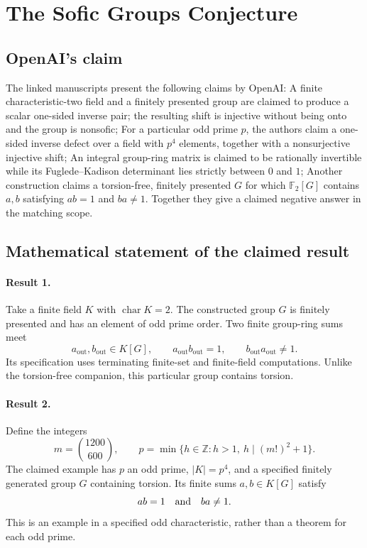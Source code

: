 \documentclass[11pt]{article}
\begin{document}
\section*{The Sofic Groups Conjecture}

\subsection{OpenAI's claim}
The linked manuscripts present the following claims by OpenAI: A finite characteristic-two field and a finitely presented group are claimed to produce a scalar one-sided inverse pair; the resulting shift is injective without being onto and the group is nonsofic; For a particular odd prime $p$, the authors claim a one-sided inverse defect over a field with $p^4$ elements, together with a nonsurjective injective shift; An integral group-ring matrix is claimed to be rationally invertible while its Fuglede--Kadison determinant lies strictly between $0$ and $1$; Another construction claims a torsion-free, finitely presented $G$ for which $\mathbb F_2[G]$ contains $a,b$ satisfying $ab=1$ and $ba\ne1$. Together they give a claimed negative answer in the matching scope.

\subsection{Mathematical statement of the claimed result}
\paragraph{Result 1.} Take a finite field \(K\) with \(\operatorname{char}K=2\). The constructed group \(G\) is finitely presented and has an element of odd prime order. Two finite group-ring sums meet
\[
 a_{\mathrm{out}},b_{\mathrm{out}}\in K[G],\qquad
 a_{\mathrm{out}}b_{\mathrm{out}}=1,\qquad
 b_{\mathrm{out}}a_{\mathrm{out}}\ne1.
\]
Its specification uses terminating finite-set and finite-field computations. Unlike the torsion-free companion, this particular group contains torsion.

\paragraph{Result 2.} Define the integers
\[
 m=\binom{1200}{600},\qquad
 p=\min\{h\in\mathbb Z:h>1,\ h\mid(m!)^2+1\}.
\]
The claimed example has \(p\) an odd prime, \(|K|=p^4\), and a specified finitely generated group \(G\) containing torsion. Its finite sums \(a,b\in K[G]\) satisfy
\[
 ab=1\quad\hbox{and}\quad ba\ne1.
\]
This is an example in a specified odd characteristic, rather than a theorem for each odd prime.
\end{document}
